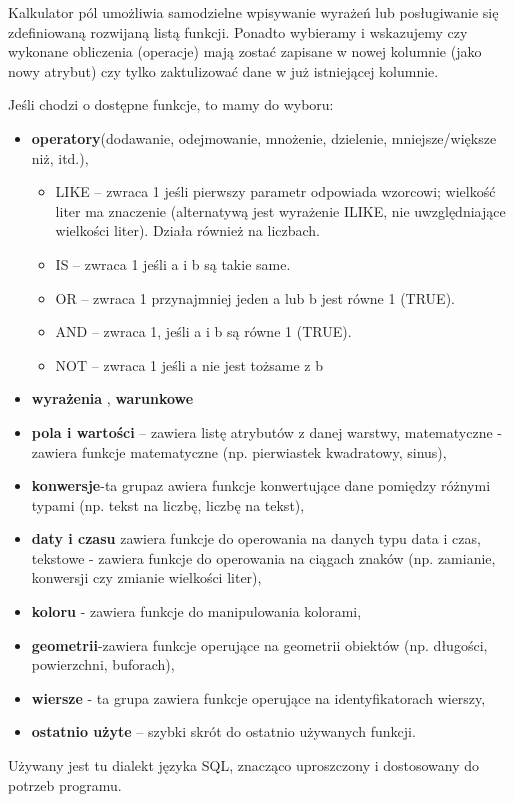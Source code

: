 \documentclass[12pt,a4paper]{book}
\begin{document}
Kalkulator pól umożliwia samodzielne wpisywanie wyrażeń lub posługiwanie się zdefiniowaną rozwijaną listą funkcji. Ponadto wybieramy i wskazujemy czy wykonane obliczenia (operacje) mają zostać zapisane w nowej kolumnie (jako nowy atrybut) czy tylko zaktulizować dane w już istniejącej kolumnie.

Jeśli chodzi o dostępne funkcje, to mamy do wyboru:

\begin{itemize}
\item \textbf{operatory}(dodawanie, odejmowanie, mnożenie, dzielenie, mniejsze/większe niż, itd.),
\begin{itemize}
\item LIKE – zwraca 1 jeśli pierwszy parametr odpowiada wzorcowi; wielkość liter ma znaczenie (alternatywą jest wyrażenie ILIKE, nie uwzględniające wielkości liter). Działa również na liczbach.
\item IS – zwraca 1 jeśli a i b są takie same.
\item OR – zwraca 1 przynajmniej jeden a lub b jest równe 1 (TRUE).
\item AND – zwraca 1, jeśli a i b są równe 1 (TRUE).
\item NOT – zwraca 1 jeśli a nie jest tożsame z b
\end{itemize}
\item \textbf{wyrażenia },\textbf{ warunkowe}
\item \textbf{pola i wartości} – zawiera listę atrybutów z danej warstwy, matematyczne - zawiera funkcje matematyczne (np. pierwiastek kwadratowy, sinus),
\item \textbf{konwersje}-ta grupaz awiera funkcje konwertujące dane pomiędzy różnymi typami (np. tekst na liczbę, liczbę na tekst),
\item \textbf{daty i czasu }zawiera funkcje do operowania na danych typu data i czas, tekstowe - zawiera funkcje do operowania na ciągach znaków (np. zamianie, konwersji czy zmianie wielkości liter),
\item \textbf{koloru }{}- zawiera funkcje do manipulowania kolorami,
\item \textbf{geometrii}{}-zawiera funkcje operujące na geometrii obiektów (np. długości, powierzchni,\textbf{ }buforach),
\item \textbf{wiersze }{}- ta grupa zawiera funkcje operujące na identyfikatorach wierszy,
\item \textbf{ostatnio użyte} – szybki skrót do ostatnio używanych funkcji.
\end{itemize}
Używany jest tu dialekt języka SQL, znacząco uproszczony i dostosowany do potrzeb programu.
\end{document}
